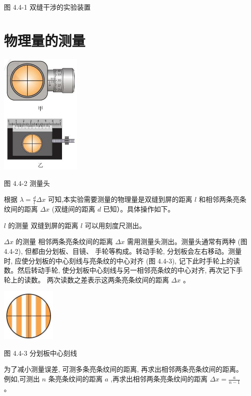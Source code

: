 \documentclass[10pt]{article}
\begin{document}
图 4.4-1 双缝干涉的实验装置

\section*{物理量的测量}

\begin{center}
\includegraphics[max width=0.3\textwidth]{images/01910e4c-ebb8-7d2c-8f2f-2375bc1d2d12_106_373584.jpg}
\end{center}

图 4.4-2 测量头

根据 \(\lambda = \frac{d}{l}{\Delta x}\) 可知,本实验需要测量的物理量是双缝到屏的距离 \(l\) 和相邻两条亮条纹间的距离 \({\Delta x}\) (双缝间的距离 \(d\) 已知）。具体操作如下。

\(l\) 的测量 双缝到屏的距离 \(l\) 可以用刻度尺测出。

\({\Delta x}\) 的测量 相邻两条亮条纹间的距离 \({\Delta x}\) 需用测量头测出。测量头通常有两种 (图 4.4-2), 但都由分划板、目镜、 手轮等构成。转动手轮, 分划板会左右移动。测量时, 应使分划板的中心刻线与亮条纹的中心对齐 (图 4.4-3), 记下此时手轮上的读数。然后转动手轮, 使分划板中心刻线与另一相邻亮条纹的中心对齐, 再次记下手轮上的读数。 两次读数之差表示这两条亮条纹间的距离 \({\Delta x}\) 。

\begin{center}
\includegraphics[max width=0.2\textwidth]{images/01910e4c-ebb8-7d2c-8f2f-2375bc1d2d12_107_297689.jpg}
\end{center}

图 4.4-3 分划板中心刻线

为了减小测量误差, 可测多条亮条纹间的距离, 再求出相邻两条亮条纹间的距离。例如,可测出 \(n\) 条亮条纹间的距离 \(a\) ,再求出相邻两条亮条纹间的距离 \({\Delta x} = \frac{a}{n - 1}\) 。
\end{document}
